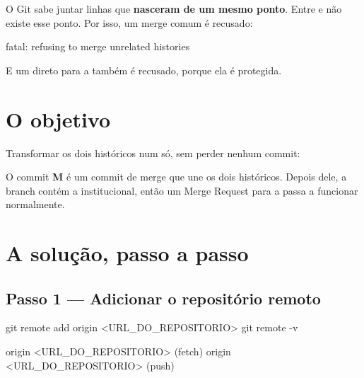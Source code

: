 O Git sabe juntar linhas que \textbf{nasceram de um mesmo ponto}. Entre  e  não existe esse ponto. Por isso, um merge comum é recusado:

\begin{saida}
fatal: refusing to merge unrelated histories
\end{saida}

E um  direto para a  também é recusado, porque ela é protegida.

\section{O objetivo}

Transformar os dois históricos num só, sem perder nenhum commit:

\begin{center}
\end{center}

O commit \textbf{M} é um commit de merge que une os dois históricos. Depois dele, a branch  contém a  institucional, então um Merge Request para a  passa a funcionar normalmente.

\section{A solução, passo a passo}

\subsection*{Passo 1 — Adicionar o repositório remoto}

\begin{terminal}
git remote add origin <URL_DO_REPOSITORIO>
git remote -v
\end{terminal}
\begin{saida}
origin    <URL_DO_REPOSITORIO> (fetch)
origin    <URL_DO_REPOSITORIO> (push)
\end{saida}

